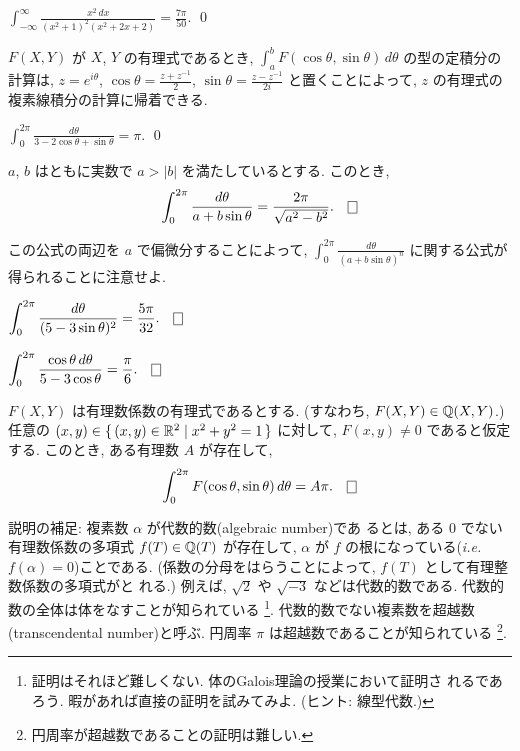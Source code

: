 \documentclass[12pt,twoside]{jarticle}
\begin{document}
\begin{question}
  \(
    \displaystyle
    \int_{-\infty}^\infty
      \frac{x^2\,dx}{(x^2 + 1)^2 (x^2+2x+2)}
    = \frac{7\pi}{50}.
  \)
  \qed
\end{question}

$F(X,Y)$ が $X$, $Y$ の有理式であるとき, 
\( \displaystyle \int_a^b F(\cos\theta, \sin\theta)\,d\theta \) 
の型の定積分の計算は, 
$\displaystyle z = e^{i\theta}$, 
$\displaystyle \cos\theta = \frac{z + z^{-1}}{2}$, 
$\displaystyle \sin\theta = \frac{z - z^{-1}}{2i}$ 
と置くことによって, $z$ の有理式の複素線積分の計算に帰着できる. 

\begin{question}
  \(
    \displaystyle
    \int_0^{2\pi} \frac{d\theta}{3 - 2 \cos\theta + \sin\theta} = \pi.
  \) 
  \qed
\end{question}

\begin{question}
  $a$, $b$ はともに実数で $a > |b|$ を満たしているとする. このとき,
  \[
    \int_0^{2\pi} \frac{d\theta}{a + b\sin\theta}
    = \frac{2\pi}{\sqrt{a^2 - b^2}}.
  \qed
  \]%
\end{question}

\noindent 
この公式の両辺を $a$ で偏微分することによって, 
\(\displaystyle
  \int_0^{2\pi} \frac{d\theta}{(a + b\sin\theta)^n}
\)
に関する公式が得られることに注意せよ. 

\begin{question}
  \(\displaystyle
    \int_0^{2\pi} \frac{d\theta}{(5 - 3\sin\theta)^2}
    = \frac{5\pi}{32}.
  \qed
  \)
\end{question}

\begin{question}
  \(\displaystyle
    \int_0^{2\pi} \frac{\cos\theta\,d\theta}{5 - 3\cos\theta}
    = \frac{\pi}{6}.
  \qed
  \)
\end{question}

\begin{question}
  $F(X,Y)$ は有理数係数の有理式であるとする. %
  (すなわち, $F(X,Y) \in {\mathbb Q}(X,Y)$.) %
  任意の $(x,y)\in \{\, (x,y)\in{\mathbb R}^2 \mid x^2 + y^2 = 1 \,\}$ に対して,
  $F(x,y)\ne 0$ であると仮定する. %
  このとき, ある有理数 $A$ が存在して,
  \[
    \int_0^{2\pi} F(\cos\theta,\sin\theta)\,d\theta = A\pi.
    \qed
  \]
\end{question}

\noindent 説明の補足: 複素数 $\alpha$ が代数的数(algebraic number)であ
るとは, ある $0$ でない有理数係数の多項式 $f(T)\in{\mathbb Q}(T)$ が存在して,
$\alpha$ が $f$ の根になっている({\it i.e.} $f(\alpha)=0$)ことである. 
(係数の分母をはらうことによって, $f(T)$ として有理整数係数の多項式がと
れる.)  例えば, $\sqrt{2}$ や $\sqrt{-3}$ などは代数的数である. 代数的
数の全体は体をなすことが知られている%
\footnote{証明はそれほど難しくない. 体のGalois理論の授業において証明さ
  れるであろう. 暇があれば直接の証明を試みてみよ. (ヒント: 線型代数.)}. %
代数的数でない複素数を超越数(transcendental number)と呼ぶ. 円周率 %
$\pi$ は超越数であることが知られている%
\footnote{円周率が超越数であることの証明は難しい.}.
\end{document}
